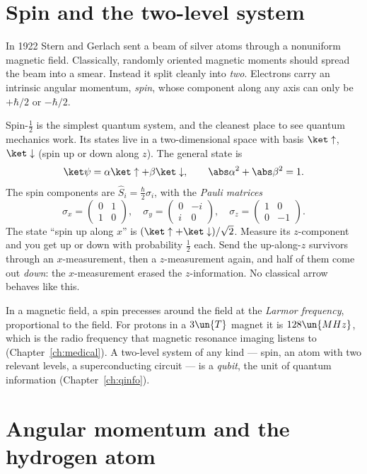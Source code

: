 \section{Spin and the two-level system}

In 1922 Stern and Gerlach sent a beam of silver atoms through a nonuniform magnetic field. Classically, randomly oriented magnetic moments should spread the beam into a smear. Instead it split cleanly into \emph{two}. Electrons carry an intrinsic angular momentum, \emph{spin}, whose component along any axis can only be $+\hbar/2$ or $-\hbar/2$.

Spin-$\tfrac12$ is the simplest quantum system, and the cleanest place to see quantum mechanics work. Its states live in a two-dimensional space with basis $\ket\uparrow$, $\ket\downarrow$ (spin up or down along $z$). The general state is
\[
  \ket\psi = \alpha\ket\uparrow + \beta\ket\downarrow,\qquad\abs\alpha^2+\abs\beta^2 = 1 .
\]
The spin components are $\hat S_i = \tfrac\hbar2\sigma_i$, with the \emph{Pauli matrices}
\[
  \sigma_x = \begin{pmatrix}0&1\\1&0\end{pmatrix},\quad
  \sigma_y = \begin{pmatrix}0&-i\\i&0\end{pmatrix},\quad
  \sigma_z = \begin{pmatrix}1&0\\0&-1\end{pmatrix}.
\]
The state ``spin up along $x$'' is $(\ket\uparrow+\ket\downarrow)/\sqrt2$. Measure its $z$-component and you get up or down with probability $\tfrac12$ each. Send the up-along-$z$ survivors through an $x$-measurement, then a $z$-measurement again, and half of them come out \emph{down}: the $x$-measurement erased the $z$-information. No classical arrow behaves like this.

In a magnetic field, a spin precesses around the field at the \emph{Larmor frequency}, proportional to the field. For protons in a $3\un{T}$ magnet it is $128\un{MHz}$, which is the radio frequency that magnetic resonance imaging listens to (Chapter~\ref{ch:medical}). A two-level system of any kind --- spin, an atom with two relevant levels, a superconducting circuit --- is a \emph{qubit}, the unit of quantum information (Chapter~\ref{ch:qinfo}).

\section{Angular momentum and the hydrogen atom}

